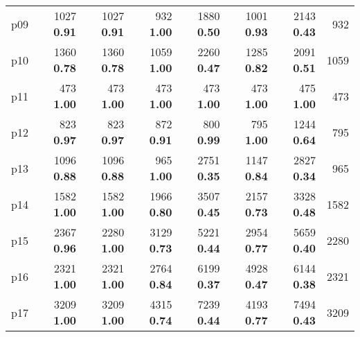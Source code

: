 \begin{tabular}{lrrrrrrr}
\multicolumn{1}{l|}{p09} & {\footnotesize 1027} \textbf{0.91} & {\footnotesize 1027} \textbf{0.91} & {\footnotesize 932} \textbf{1.00} & {\footnotesize 1880} \textbf{0.50} & {\footnotesize 1001} \textbf{0.93} & {\footnotesize 2143} \textbf{0.43} & \multicolumn{1}{|r}{932}\\
\multicolumn{1}{l|}{p10} & {\footnotesize 1360} \textbf{0.78} & {\footnotesize 1360} \textbf{0.78} & {\footnotesize 1059} \textbf{1.00} & {\footnotesize 2260} \textbf{0.47} & {\footnotesize 1285} \textbf{0.82} & {\footnotesize 2091} \textbf{0.51} & \multicolumn{1}{|r}{1059}\\
\multicolumn{1}{l|}{p11} & {\footnotesize 473} \textbf{1.00} & {\footnotesize 473} \textbf{1.00} & {\footnotesize 473} \textbf{1.00} & {\footnotesize 473} \textbf{1.00} & {\footnotesize 473} \textbf{1.00} & {\footnotesize 475} \textbf{1.00} & \multicolumn{1}{|r}{473}\\
\multicolumn{1}{l|}{p12} & {\footnotesize 823} \textbf{0.97} & {\footnotesize 823} \textbf{0.97} & {\footnotesize 872} \textbf{0.91} & {\footnotesize 800} \textbf{0.99} & {\footnotesize 795} \textbf{1.00} & {\footnotesize 1244} \textbf{0.64} & \multicolumn{1}{|r}{795}\\
\multicolumn{1}{l|}{p13} & {\footnotesize 1096} \textbf{0.88} & {\footnotesize 1096} \textbf{0.88} & {\footnotesize 965} \textbf{1.00} & {\footnotesize 2751} \textbf{0.35} & {\footnotesize 1147} \textbf{0.84} & {\footnotesize 2827} \textbf{0.34} & \multicolumn{1}{|r}{965}\\
\multicolumn{1}{l|}{p14} & {\footnotesize 1582} \textbf{1.00} & {\footnotesize 1582} \textbf{1.00} & {\footnotesize 1966} \textbf{0.80} & {\footnotesize 3507} \textbf{0.45} & {\footnotesize 2157} \textbf{0.73} & {\footnotesize 3328} \textbf{0.48} & \multicolumn{1}{|r}{1582}\\
\multicolumn{1}{l|}{p15} & {\footnotesize 2367} \textbf{0.96} & {\footnotesize 2280} \textbf{1.00} & {\footnotesize 3129} \textbf{0.73} & {\footnotesize 5221} \textbf{0.44} & {\footnotesize 2954} \textbf{0.77} & {\footnotesize 5659} \textbf{0.40} & \multicolumn{1}{|r}{2280}\\
\multicolumn{1}{l|}{p16} & {\footnotesize 2321} \textbf{1.00} & {\footnotesize 2321} \textbf{1.00} & {\footnotesize 2764} \textbf{0.84} & {\footnotesize 6199} \textbf{0.37} & {\footnotesize 4928} \textbf{0.47} & {\footnotesize 6144} \textbf{0.38} & \multicolumn{1}{|r}{2321}\\
\multicolumn{1}{l|}{p17} & {\footnotesize 3209} \textbf{1.00} & {\footnotesize 3209} \textbf{1.00} & {\footnotesize 4315} \textbf{0.74} & {\footnotesize 7239} \textbf{0.44} & {\footnotesize 4193} \textbf{0.77} & {\footnotesize 7494} \textbf{0.43} & \multicolumn{1}{|r}{3209}\\

\end{tabular}
